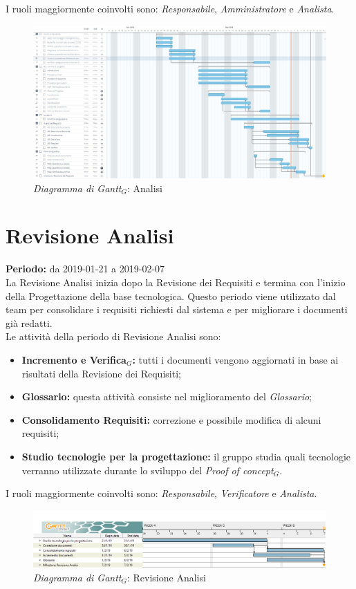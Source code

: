 \begin{flushleft}
\begin{itemize}
\end{itemize}
I ruoli maggiormente coinvolti sono: \textit{Responsabile}, \textit{Amministratore} e \textit{Analista}.
\begin{figure} [h]
    \centering
    \includegraphics[scale=0.3]{./images/analisi.jpg}
    \caption{\textit{Diagramma di Gantt$_{G}$}: Analisi}\label{G1}
\end{figure}
\section{Revisione Analisi}
\textbf{Periodo:} da 2019-01-21 a 2019-02-07\\
La Revisione Analisi inizia dopo la Revisione dei Requisiti e termina con l’inizio della Progettazione della base tecnologica. Questo periodo viene utilizzato dal team per consolidare i requisiti richiesti dal sistema e per migliorare i documenti già redatti.\\
Le attività della periodo di Revisione Analisi sono:
\begin{itemize}
    \item \textbf{Incremento e Verifica$_{G}$:} tutti i documenti vengono aggiornati in base ai risultati della Revisione dei Requisiti;
    \item \textbf{Glossario:} questa attività consiste nel miglioramento del \textit{Glossario};
    \item \textbf{Consolidamento Requisiti:} correzione e possibile modifica di alcuni requisiti;
    \item \textbf{Studio tecnologie per la progettazione:} il gruppo studia quali tecnologie verranno utilizzate durante lo sviluppo del \textit{Proof of concept$_{G}$}.  
\end{itemize}
I ruoli maggiormente coinvolti sono: \textit{Responsabile}, \textit{Verificatore} e \textit{Analista}.
\begin{figure} [h]
    \centering
    \includegraphics[scale=0.45]{./images/ZeroSevenGanttRevisioneA.png}
    \caption{\textit{Diagramma di Gantt$_{G}$}: Revisione Analisi }\label{G2}
\end{figure}
\newpage

\end{flushleft}
